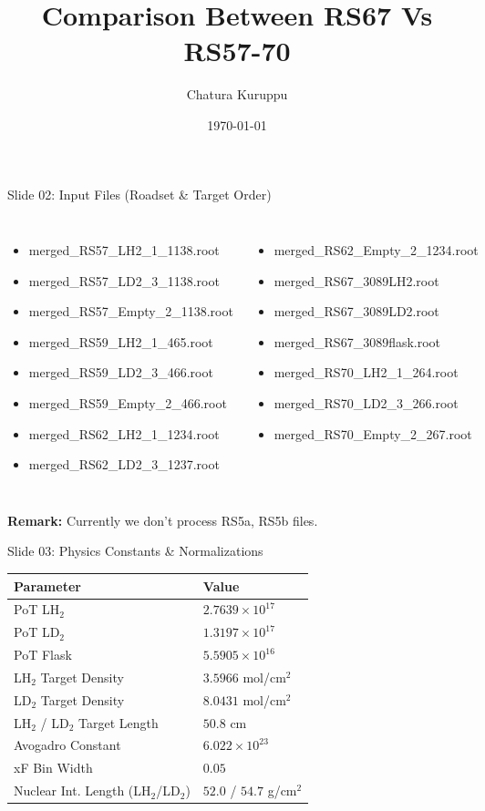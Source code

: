 \documentclass[aspectratio=169]{beamer}
\title{Comparison Between RS67 Vs RS57-70}
\author{Chatura Kuruppu}
\date{\today}
\begin{document}
\begin{frame}
\titlepage
\end{frame}
\begin{frame}{Slide 02: Input Files (Roadset \& Target Order)}
\begin{columns}
\tiny\begin{itemize}
\item merged\_RS57\_LH2\_1\_1138.root
\item merged\_RS57\_LD2\_3\_1138.root
\item merged\_RS57\_Empty\_2\_1138.root
\item merged\_RS59\_LH2\_1\_465.root
\item merged\_RS59\_LD2\_3\_466.root
\item merged\_RS59\_Empty\_2\_466.root
\item merged\_RS62\_LH2\_1\_1234.root
\item merged\_RS62\_LD2\_3\_1237.root
\end{itemize}\tiny\begin{itemize}
\item merged\_RS62\_Empty\_2\_1234.root
\item merged\_RS67\_3089LH2.root
\item merged\_RS67\_3089LD2.root
\item merged\_RS67\_3089flask.root
\item merged\_RS70\_LH2\_1\_264.root
\item merged\_RS70\_LD2\_3\_266.root
\item merged\_RS70\_Empty\_2\_267.root
\end{itemize}\end{columns}
\vspace{0.3cm}\centering\small\textbf{Remark:} Currently we don't process RS5a, RS5b files.
\end{frame}
\begin{frame}{Slide 03: Physics Constants \& Normalizations}
\centering\footnotesize
\begin{tabular}{ll}
\toprule \textbf{Parameter} & \textbf{Value} \\ \midrule
PoT LH$_2$ & $2.7639 \times 10^{17}$ \\
PoT LD$_2$ & $1.3197 \times 10^{17}$ \\
PoT Flask & $5.5905 \times 10^{16}$ \\
LH$_2$ Target Density & $3.5966$ mol/cm$^2$ \\
LD$_2$ Target Density & $8.0431$ mol/cm$^2$ \\
LH$_2$ / LD$_2$ Target Length & $50.8$ cm \\
Avogadro Constant & $6.022 \times 10^{23}$ \\
xF Bin Width & $0.05$ \\
Nuclear Int. Length (LH$_2$/LD$_2$) & $52.0$ / $54.7$ g/cm$^2$ \\
\bottomrule \end{tabular}
\end{frame}
\end{document}
